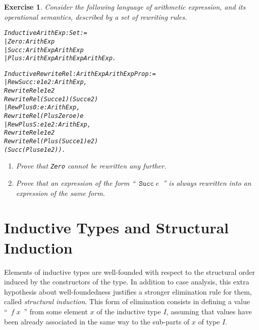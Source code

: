 \documentclass[11pt]{article}
\newtheorem{exercise}{Exercise}[section]
\begin{document}
\begin{exercise}
Consider the following language of arithmetic expression, and 
its operational semantics, described by a set of rewriting rules.

\begin{alltt}
Inductive ArithExp : Set :=
   | Zero : ArithExp 
   | Succ : ArithExp {\arrow} ArithExp
   | Plus : ArithExp {\arrow} ArithExp {\arrow} ArithExp.

Inductive RewriteRel : ArithExp {\arrow} ArithExp {\arrow} Prop :=
  |  RewSucc  : {\prodsym} e1 e2 :ArithExp,
                  RewriteRel e1 e2 {\arrow}
                   RewriteRel (Succ e1) (Succ e2) 
  |  RewPlus0 : {\prodsym} e:ArithExp,
                  RewriteRel (Plus Zero e) e 
  |  RewPlusS : {\prodsym} e1 e2:ArithExp,
                  RewriteRel e1 e2 {\arrow}
                  RewriteRel (Plus (Succ e1) e2) 
                             (Succ (Plus e1 e2)).

\end{alltt}
\begin{enumerate}
\item Prove that \texttt{Zero} cannot be rewritten any further.
\item Prove that an expression of the form ``~$\texttt{Succ}\;e$~'' is always 
rewritten
into an expression of the same form.
\end{enumerate}
\end{exercise}



\section{Inductive Types and Structural Induction} 
\label{StructuralInduction}

Elements of inductive types  are well-founded with
respect to the structural order induced by the constructors of the
type. In addition to case analysis, this extra hypothesis about
well-foundedness justifies a stronger elimination rule for them, called
\textsl{structural induction}.  This form of elimination consists in
defining a value ``~$f\;x$~'' from some element $x$ of the inductive type
$I$, assuming that values have been already associated in the same way
to the sub-parts of $x$ of type $I$.
\end{document}
